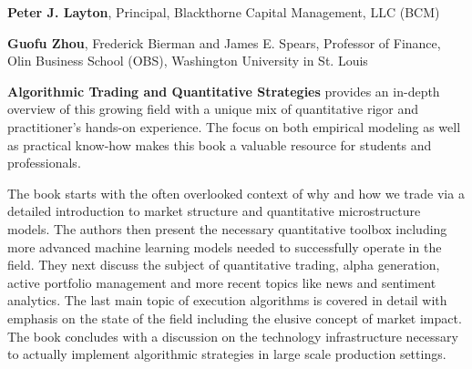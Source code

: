 \pagestyle{empty}


 \par
{%
\begin{flushright}
\begin{minipage}{0.6\textwidth}
\textbf{Peter J. Layton}, Principal, Blackthorne Capital Management, LLC (BCM)
\end{minipage}
\end{flushright} 
\twomedskip
}


 \par
{%
\begin{flushright}
\begin{minipage}{0.6\textwidth}
\textbf{Guofu Zhou}, Frederick Bierman and James E. Spears, Professor of Finance, Olin Business School (OBS), Washington University in St. Louis 
\end{minipage}
\end{flushright}
} \medskip



\newpage



\noindent\textbf{Algorithmic Trading and Quantitative Strategies} provides an in-depth overview of this growing field with a unique mix of quantitative rigor and practitioner's hands-on experience. The focus on both empirical modeling as well as practical know-how makes this book a valuable resource for students and professionals. \twomedskip


\noindent The book starts with the often overlooked context of why and how we trade via a detailed introduction to market structure and quantitative microstructure models. The authors then present the necessary quantitative toolbox including more advanced machine learning models needed to successfully operate in the field. They next discuss the subject of quantitative trading, alpha generation, active portfolio management and more recent topics like news and sentiment analytics. The last main topic of execution algorithms is covered in detail with emphasis on the state of the field including the elusive concept of market impact. The book concludes with a discussion on the technology infrastructure necessary to actually implement algorithmic strategies in large scale production settings. \twomedskip


